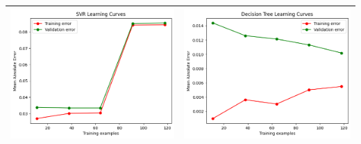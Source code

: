 \begin{table}[H]
    \centering
    \footnotesize
    \setlength\tabcolsep{0pt}
    \begin{tabularx}{\textwidth}{|X|X|}
        \hline
        \includegraphics[width=\linewidth, trim=0 0 0 0]{images/SVR_lc50.png} &
        \includegraphics[width=\linewidth, trim=0 0 0 0]{images/DecisionTree_lc50.png} \\
        \hline

\end{tabularx}
\end{table}
